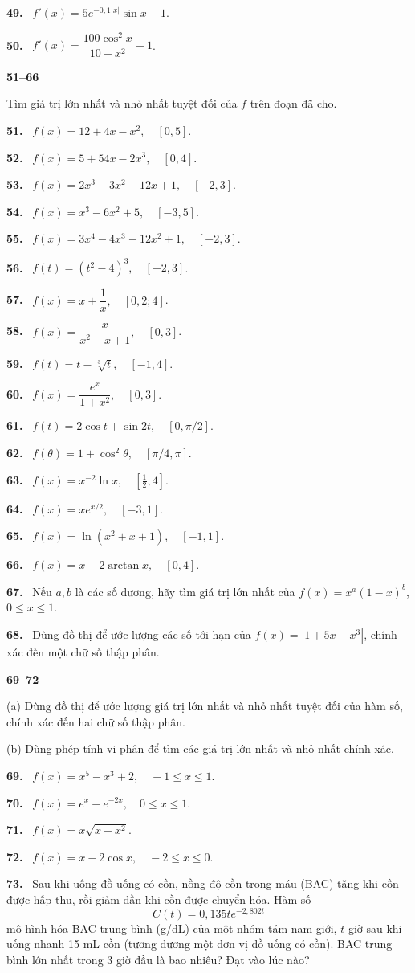\documentclass[12pt,a4paper]{article}
\newcommand{\bt}[1]{\par\smallskip\Needspace{5\baselineskip}\noindent\textbf{#1.}\ }
\newcommand{\group}[1]{\par\medskip\noindent\textbf{#1}\par\nopagebreak[4]}
\begin{document}
\bt{49} $f'(x)=5e^{-0{,}1|x|}\sin x-1$.
\bt{50} $f'(x)=\dfrac{100\cos^2x}{10+x^2}-1$.
\group{51–66} Tìm giá trị lớn nhất và nhỏ nhất tuyệt đối của $f$ trên đoạn đã cho.
\bt{51} $f(x)=12+4x-x^2,\quad [0,5]$.
\bt{52} $f(x)=5+54x-2x^3,\quad [0,4]$.
\bt{53} $f(x)=2x^3-3x^2-12x+1,\quad [-2,3]$.
\bt{54} $f(x)=x^3-6x^2+5,\quad [-3,5]$.
\bt{55} $f(x)=3x^4-4x^3-12x^2+1,\quad [-2,3]$.
\bt{56} $f(t)=(t^2-4)^3,\quad [-2,3]$.
\bt{57} $f(x)=x+\dfrac1x,\quad [0{,}2;4]$.
\bt{58} $f(x)=\dfrac{x}{x^2-x+1},\quad [0,3]$.
\bt{59} $f(t)=t-\sqrt[3]t,\quad [-1,4]$.
\bt{60} $f(x)=\dfrac{e^x}{1+x^2},\quad [0,3]$.
\bt{61} $f(t)=2\cos t+\sin2t,\quad [0,\pi/2]$.
\bt{62} $f(\theta)=1+\cos^2\theta,\quad [\pi/4,\pi]$.
\bt{63} $f(x)=x^{-2}\ln x,\quad [\frac12,4]$.
\bt{64} $f(x)=xe^{x/2},\quad [-3,1]$.
\bt{65} $f(x)=\ln(x^2+x+1),\quad [-1,1]$.
\bt{66} $f(x)=x-2\arctan x,\quad [0,4]$.
\bt{67} Nếu $a,b$ là các số dương, hãy tìm giá trị lớn nhất của $f(x)=x^a(1-x)^b$, $0\le x\le1$.
\bt{68} Dùng đồ thị để ước lượng các số tới hạn của $f(x)=|1+5x-x^3|$, chính xác đến một chữ số thập phân.
\group{69–72} (a) Dùng đồ thị để ước lượng giá trị lớn nhất và nhỏ nhất tuyệt đối của hàm số, chính xác đến hai chữ số thập phân.

(b) Dùng phép tính vi phân để tìm các giá trị lớn nhất và nhỏ nhất chính xác.
\bt{69} $f(x)=x^5-x^3+2,\quad -1\le x\le1$.
\bt{70} $f(x)=e^x+e^{-2x},\quad 0\le x\le1$.
\bt{71} $f(x)=x\sqrt{x-x^2}$.
\bt{72} $f(x)=x-2\cos x,\quad -2\le x\le0$.
\bt{73} Sau khi uống đồ uống có cồn, nồng độ cồn trong máu (BAC) tăng khi cồn được hấp thu, rồi giảm dần khi cồn được chuyển hóa. Hàm số
\[C(t)=0{,}135te^{-2{,}802t}\]
mô hình hóa BAC trung bình (g/dL) của một nhóm tám nam giới, $t$ giờ sau khi uống nhanh 15 mL cồn (tương đương một đơn vị đồ uống có cồn). BAC trung bình lớn nhất trong 3 giờ đầu là bao nhiêu? Đạt vào lúc nào?
\end{document}
